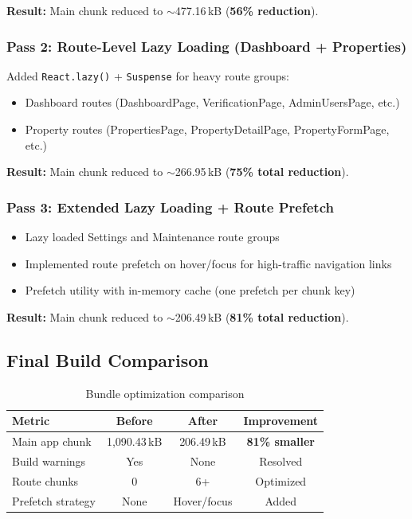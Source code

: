\documentclass[12pt,a4paper]{article}
\begin{document}
\noindent\textbf{Result:} Main chunk reduced to $\sim$477.16\,kB (\textbf{56\% reduction}).

\subsubsection{Pass 2: Route-Level Lazy Loading (Dashboard + Properties)}

Added \texttt{React.lazy()} + \texttt{Suspense} for heavy route groups:

\begin{itemize}[noitemsep]
    \item Dashboard routes (DashboardPage, VerificationPage, AdminUsersPage, etc.)
    \item Property routes (PropertiesPage, PropertyDetailPage, PropertyFormPage, etc.)
\end{itemize}

\noindent\textbf{Result:} Main chunk reduced to $\sim$266.95\,kB (\textbf{75\% total reduction}).

\subsubsection{Pass 3: Extended Lazy Loading + Route Prefetch}

\begin{itemize}[noitemsep]
    \item Lazy loaded Settings and Maintenance route groups
    \item Implemented route prefetch on hover/focus for high-traffic navigation links
    \item Prefetch utility with in-memory cache (one prefetch per chunk key)
\end{itemize}

\noindent\textbf{Result:} Main chunk reduced to $\sim$206.49\,kB (\textbf{81\% total reduction}).

\subsection{Final Build Comparison}

\begin{table}[H]
\centering
\begin{tabular}{lccc}
\toprule
\textbf{Metric} & \textbf{Before} & \textbf{After} & \textbf{Improvement} \\
\midrule
Main app chunk   & 1,090.43\,kB & 206.49\,kB & \textbf{81\% smaller} \\
Build warnings   & Yes          & None        & Resolved \\
Route chunks     & 0            & 6+          & Optimized \\
Prefetch strategy& None         & Hover/focus & Added \\
\bottomrule
\end{tabular}
\caption{Bundle optimization comparison}
\end{table}
\end{document}
